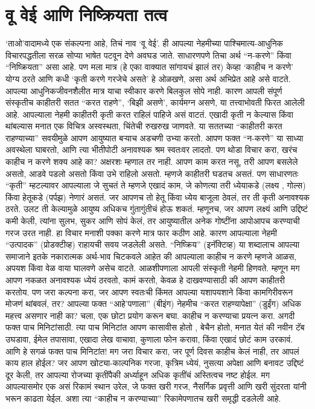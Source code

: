  \chapter{वू वेई आणि निष्क्रियता तत्व}
‘ताओ’वादामध्ये एक संकल्पना आहे, तिचं  नाव ‘वू वेई’. ही आपल्या नेहमीच्या पाश्चिमात्य-आधुनिक विचारपद्धतीला सरळ सोप्या भाषेत पटवून देणे अवघड जाते. साधारणपणे तिचा अर्थ “न-करणे” किंवा “निष्क्रियता” असा आहे. पण मला मात्र (हे एका वाक्यात सांगायचं झालं तर) केव्हा ‘काहीच न करणे’ योग्य ठरते आणि कधी ‘कृती करणे गरजेचे असते’ हे ओळखणे, असा अर्थ अभिप्रेत आहे असे वाटते.
आपल्या आधुनिकजीवनशैलीत मात्र याचा स्वीकार करणे बिलकुल सोपे नाही. कारण आपली संपूर्ण संस्कृतीच काहीतरी सतत “करत राहणे”, ‘बिझी असणे’, कार्यमग्न असणे, या तत्त्वाभोवती फिरत आलेली आहे. आपल्याला नेहमी काहीतरी कृती करत राहिलं पाहिजे असं वाटतं. एखादी कृती न केल्यास किंवा थांबल्यास मनात एक विचित्र अस्वस्थता, चिंतेची रुखरुख जाणवते. या सततच्या “काहीतरी करत राहण्याच्या” सवयीमुळे आपण आयुष्यात बऱ्याच अडचणी उभ्या करतो. आपण फक्त “न-करणे” या साध्या अवस्थेला घाबरतो, आणि त्या भीतीपोटी अनावश्यक श्रम स्वतःवर लादतो.
पण थोडा विचार करा, खरंच काहीच न करणे शक्य आहे का? अक्षरशः म्हणाल तर नाही. आपण काम करत नसू, तरी आपण बसलेले असतो, आडवे पडलो असतो किंवा उभे राहिलो असतो. म्हणजे काहीतरी घडतच असतं. पण साधारणतः “कृती” म्हटल्यावर आपल्याला जे सुचतं ते म्हणजे एखादं काम, जे कोणत्या तरी ध्येयाकडे (लक्ष्य , गोल्स) किंवा हेतूकडे (पर्पझ) नेणारं असतं. जर आपणच तो हेतू किंवा ध्येय बाजूला ठेवलं, तर ती कृती अनावश्यक ठरते. उलट ती केल्यामुळे आयुष्य अधिकच गुंतागुंतीचं होऊ शकतं.
म्हणूनच, जर आपण लक्ष्यं आणि उद्दिष्टं कमी केली, त्यांना सुलभ, सुकर आणि सोपं केलं, तर आयुष्यातील अनेक गोष्टींना आपोआपच करण्याची गरज उरत नाही.
हा विचार मनाशी पक्का करणे मात्र फार कठीण आहे. कारण आपल्याला नेहमी “उत्पादक” (प्रोडक्टीव्ह) राहायची सवय जडलेली असते. “निष्क्रिय” (इनॅक्टिव्ह) या शब्दालाच आपल्या समाजाने इतके नकारात्मक अर्थ-भाव चिटकवले आहेत की आपल्याला काहीच न करणे म्हणजे आळस, अपयश किंवा वेळ वाया घालवणे असेच वाटते. आळशीपणाला आपली संस्कृती नेहमी हिणवते. म्हणून मग आपण नकळत अनावश्यक ध्येयं ठरवतो, कामं करतो, केवळ हे दाखवण्यासाठी की आपण काहीतरी करतोय.
पण जरा कल्पना करा, जर आपण स्वतःची किंमत आपल्या यशापयशाने किंवा कामगिरीवरून मोजणं थांबवलं, तर? आपल्या फक्त “आहे’पणाला” (बीइंग) नेहमीच “करत राहण्यापेक्षा” (डुईंग) अधिक महत्त्व असणार नाही का?
चला, एक छोटा प्रयोग करून बघा. काहीच न करण्याचा प्रयत्न करा. अगदी फक्त पाच मिनिटांसाठी. त्या पाच मिनिटांत आपण कासावीस होतो , बेचैन होतो, मनात येतं की नवीन टॅब उघडावा, ईमेल तपासावा, एखादा लेख वाचावा, कुणाला फोन करावा, किंवा एखादं छोटं काम उरकावं. आणि हे सगळं फक्त पाच मिनिटांत! मग जरा विचार करा, जर पूर्ण दिवस काहीच केलं नाही, तर आपलं काय हाल होईल?
जर आपण खोट्या-काल्पनिक गरजा, कृत्रिम ध्येयं, नुसत्या अपेक्षा आणि बनावट उद्दिष्टं दूर केली, तर आपल्या रोजच्या कृतींपैकी अर्ध्याहून अधिक कृतींचं अस्तित्वच नष्ट होईल. मग आपल्यासमोर एक असं रिकामं स्थान उरेल, जे फक्त खरी गरज, नैसर्गिक प्रवृत्ती आणि खरी सुंदरता यांनी भरून काढता येईल.
अशा त्या “काहीच न करण्याच्या” रिकामेपणातच खरी समृद्धी दडलेली आहे.


